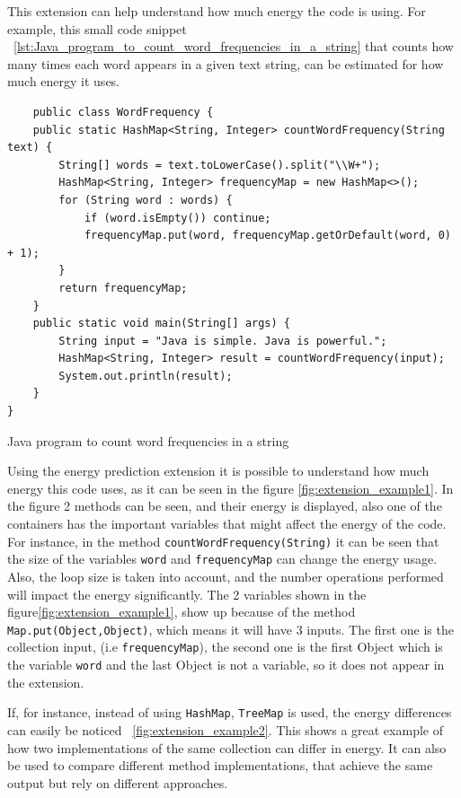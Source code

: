 This extension can help understand how much energy the code is using.
For example, this small code snippet ~\ref{lst:Java_program_to_count_word_frequencies_in_a_string} that counts how many times each word appears in a given text string, can be estimated for how much energy it uses.

\begin{listing}[H]
\begin{verbatim}
    public class WordFrequency {
    public static HashMap<String, Integer> countWordFrequency(String text) {
        String[] words = text.toLowerCase().split("\\W+");
        HashMap<String, Integer> frequencyMap = new HashMap<>();
        for (String word : words) {
            if (word.isEmpty()) continue; 
            frequencyMap.put(word, frequencyMap.getOrDefault(word, 0) + 1);
        }
        return frequencyMap;
    }
    public static void main(String[] args) {
        String input = "Java is simple. Java is powerful.";
        HashMap<String, Integer> result = countWordFrequency(input);
        System.out.println(result);
    }
}
\end{verbatim}
\caption{Java program to count word frequencies in a string}            
\label{lst:Java_program_to_count_word_frequencies_in_a_string}
\end{listing}

Using the energy prediction extension it is possible to understand how much energy this code uses, as it can be seen in the figure \ref{fig:extension_example1}.
In the figure 2 methods can be seen, and their energy is displayed, also one of the containers has the important variables that might affect the energy of the code. For instance, in the method \texttt{countWordFrequency(String)} it can be seen that the size of the variables \texttt{word} and \texttt{frequencyMap} can change the energy usage. Also, the loop size is taken into account, and the number operations performed will impact the energy significantly.
The 2 variables shown in the figure\ref{fig:extension_example1}, show up because of the method \texttt{Map.put(Object,Object)}, which means it will have 3 inputs. The first one is the collection input, (i.e \texttt{frequencyMap}), the second one is the first Object which is the variable \texttt{word} and the last Object is not a variable, so it does not appear in the extension.


If, for instance, instead of using \texttt{HashMap}, \texttt{TreeMap} is used, the energy differences can easily be noticed ~\ref{fig:extension_example2}. This shows a great example of how two implementations of the same collection can differ in energy. It can also be used to compare different method implementations, that achieve the same output but rely on different approaches.



